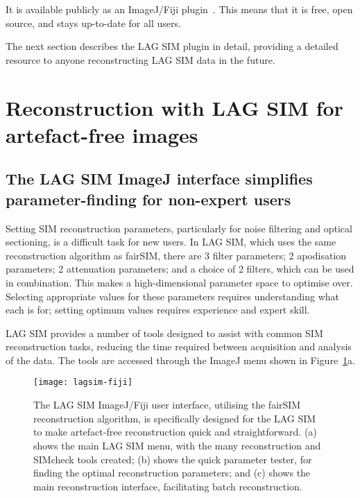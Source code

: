 It is available publicly as an ImageJ/Fiji plugin~\cite{lagsim}.
This means that it is free, open source, and stays up-to-date for all users.

The next section describes the LAG SIM plugin in detail, providing a detailed resource to anyone reconstructing LAG SIM data in the future.


\section{Reconstruction with LAG SIM for artefact-free images} \label{sec:lagsimFiji}

\subsection{The LAG SIM ImageJ interface simplifies parameter-finding for non-expert users}

Setting SIM reconstruction parameters, particularly for noise filtering and optical sectioning, is a difficult task for new users.
In LAG SIM, which uses the same reconstruction algorithm as fairSIM, there are 3 filter parameters; 2 apodisation parameters; 2 attenuation parameters; and a choice of 2 filters, which can be used in combination.
This makes a high-dimensional parameter space to optimise over.
Selecting appropriate values for these parameters requires understanding what each is for; setting optimum values requires experience and expert skill.

LAG SIM provides a number of tools designed to assist with common SIM reconstruction tasks, reducing the time required between acquisition and analysis of the data.
The tools are accessed through the ImageJ menu shown in Figure~\ref{fig:lagsim-fiji-interface}a.

\begin{figure}[b!]
	\centering
		\texttt{[image: lagsim-fiji]}
	\caption[LAG SIM: A Fiji interface makes artefact-free reconstruction quick and simple for non-expert users]{The LAG SIM ImageJ/Fiji user interface, utilising the fairSIM reconstruction algorithm, is specifically designed for the LAG SIM to make artefact-free reconstruction quick and straightforward. (a) shows the main LAG SIM menu, with the many reconstruction and SIMcheck tools created; (b) shows the quick parameter tester, for finding the optimal reconstruction parameters; and (c) shows the main reconstruction interface, facilitating batch reconstruction. }
\label{fig:lagsim-fiji-interface}
\end{figure}

